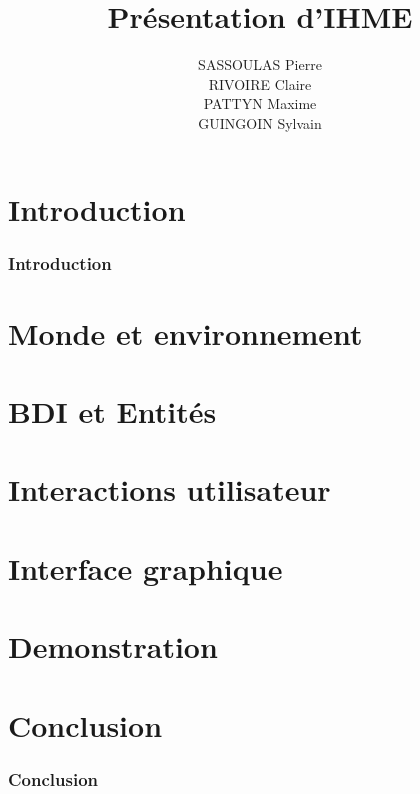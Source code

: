 \documentclass{beamer}
\title{Présentation d'IHME}
\author{SASSOULAS Pierre\\RIVOIRE Claire\\PATTYN Maxime\\GUINGOIN Sylvain}
\begin{document}
\frame{\titlepage}
\frame{\tableofcontents}

\section{Introduction}
\begin{frame}
  \frametitle{Introduction}
\end{frame}

\section{Monde et environnement}
\begin{frame}
  
\end{frame}

\section{BDI et Entités}
\begin{frame}
  
\end{frame}

\section{Interactions utilisateur}
\begin{frame}
  
\end{frame}

\section{Interface graphique}
\begin{frame}
  
\end{frame}

\section{Demonstration}
\begin{frame}
  
\end{frame}


\section{Conclusion}
\begin{frame}
  \frametitle{Conclusion}
\end{frame}
\end{document}
